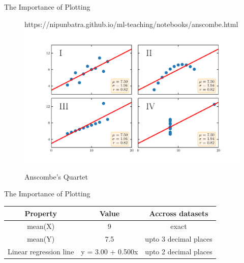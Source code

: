 \documentclass[usenames,dvipsnames]{beamer}
\begin{document}
\begin{frame}{The Importance of Plotting}
    \begin{figure}[htp]
      \centering
      \begin{notebookbox}{https://nipunbatra.github.io/ml-teaching/notebooks/anscombe.html}
        \includegraphics[width=\linewidth]{../figures/anscombe.pdf}
      \end{notebookbox}
      \caption{Anscombe’s Quartet}
    \end{figure}
  \end{frame}

\begin{frame}{The Importance of Plotting}
\begin{tabular}{|c|c|c|}
\hline 
Property & Value & Accross datasets \\ 
\hline 
mean(X) & 9 & exact \\ 
mean(Y) & 7.5 & upto 3 decimal places \\ 
Linear regression line & 	y = 3.00 + 0.500x & upto 2 decimal places \\ 
\hline 
\end{tabular} 


\end{frame}
\end{document}

